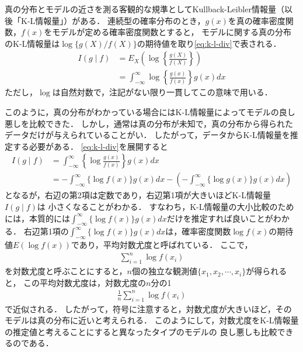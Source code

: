 真の分布とモデルの近さを測る客観的な規準としてKullback-Leibler情報量（以後「K-L情報量」）がある．
連続型の確率分布のとき，$g(x)$を真の確率密度関数，$f(x)$をモデルが定める確率密度関数とすると，
モデルに関する真の分布のK-L情報量は$\log\{g(X)/f(X)\}$の期待値を取り\eqref{eq:k-l-div}で表される．
\begin{align}
  \label{eq:k-l-div}
  I(g \mid f) &= E_X\left(\log \left\{\frac{g(X)}{f(X)}\right\}\right)\\\nonumber
              &= \int^{\infty}_{-\infty}\log\left\{\frac{g(x)}{f(x)}\right\}g(x)dx
\end{align}
ただし，$\log$は自然対数で，注記がない限り一貫してこの意味で用いる．

このように，真の分布がわかっている場合にはK-L情報量によってモデルの良し悪しを比較できた．
しかし，通常は真の分布が未知で，真の分布から得られたデータだけが与えられていることがい．
したがって，データからK-L情報量を推定する必要がある．
\eqref{eq:k-l-div}を展開すると
\begin{align*}
  I(g \mid f) &= \int^{\infty}_{-\infty}\left\{\log\frac{g(x)}{f(x)}\right\}g(x)dx\\\nonumber
              &= -\int^{\infty}_{-\infty}\{\log f(x)\}g(x)dx - 
                 \left(-\int^{\infty}_{-\infty}\{\log g(x)\}g(x)dx\right)
\end{align*}
となるが，右辺の第2項は定数であり，右辺第1項が大きいほどK-L情報量$I(g \mid f)$は
小さくなることがわかる．
すなわち，K-L情報量の大小比較のためには，本質的には$\int^{\infty}_{-\infty}\{\log f(x)\}g(x)dx$だけを推定すれば良いことがわかる．
右辺第1項の$\int^{\infty}_{-\infty}\{\log f(x)\}g(x)dx$は，確率密度関数$\log f(x)$の期待値$E( \log f(x))$であり，平均対数尤度と呼ばれている．
ここで，
\begin{align*}
  \sum_{i=1}^{n}\log f(x_i)
\end{align*}
を対数尤度と呼ぶことにすると，$n$個の独立な観測値$\{x_1, x_2, \cdots, x_i\}$が得られると，
この平均対数尤度は，対数尤度の$n$分の1
\begin{align*}
  \frac{1}{n}\sum_{i=1}^{n}\log f(x_i)
\end{align*}
で近似される．
したがって，符号に注意すると，対数尤度が大きいほど，そのモデルは真の分布に近いと考えられる．
このようにして，対数尤度をK-L情報量の推定値と考えることにすると異なったタイプのモデルの
良し悪しも比較できるのである．

